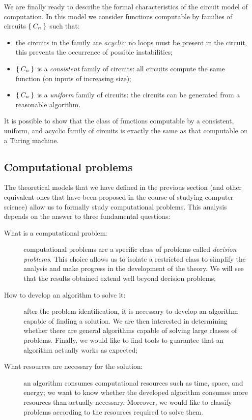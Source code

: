 We are finally ready to describe the formal characteristics of the circuit model of computation. In this model we consider functions computable by families of circuits $\Set{C_n}$ such that:
\begin{itemize}
	\item the circuits in the family are \emph{acyclic}: no loops must be present in the circuit, this prevents the occurrence of possible instabilities;
	\item $\Set{C_n}$ is a \emph{consistent} family of circuits: all circuits compute the same function (on inputs of increasing size);
	\item $\Set{C_n}$ is a \emph{uniform} family of circuits: the circuits can be generated from a reasonable algorithm. 
\end{itemize}

It is possible to show that the class of functions computable by a consistent, uniform, and acyclic family of circuits is exactly the same as that computable on a Turing machine.

\subsection{Computational problems}
The theoretical models that we have defined in the previous section (and other equivalent ones that have been proposed in the course of studying computer science) allow us to formally study computational problems. This analysis depends on the answer to three fundamental questions:
\begin{description}
	\item[What is a computational problem:] computational problems are a specific class of problems called \emph{decision problems}. This choice allows us to isolate a restricted class to simplify the analysis and make progress in the development of the theory. We will see that the results obtained extend well beyond decision problems;
	\item[How to develop an algorithm to solve it:] after the problem identification, it is necessary to develop an algorithm capable of finding a solution. We are then interested in determining whether there are general algorithms capable of solving large classes of problems. Finally, we would like to find tools to guarantee that an algorithm actually works as expected;
	\item[What resources are necessary for the solution:] an algorithm consumes computational resources such as time, space, and energy; we want to know whether the developed algorithm consumes more resources than actually necessary. Moreover, we would like to classify problems according to the resources required to solve them.
\end{description}

